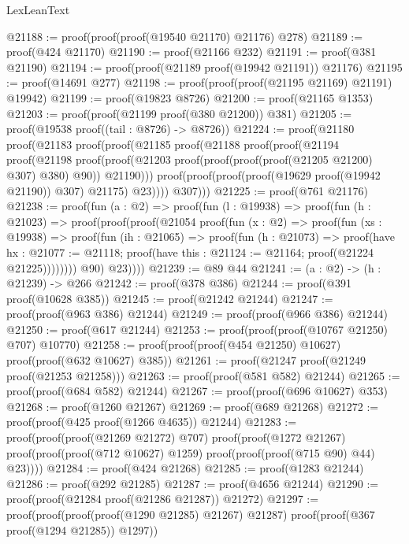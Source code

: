 \begin{lexlean}{LexLeanText}
\begin{coremodule}
@21188 := proof(proof(proof(@19540 @21170) @21176) @278)
@21189 := proof(@424 @21170)
@21190 := proof(@21166 @232)
@21191 := proof(@381 @21190)
@21194 := proof(proof(@21189 proof(@19942 @21191)) @21176)
@21195 := proof(@14691 @277)
@21198 := proof(proof(proof(@21195 @21169) @21191) @19942)
@21199 := proof(@19823 @8726)
@21200 := proof(@21165 @1353)
@21203 := proof(proof(@21199 proof(@380 @21200)) @381)
@21205 := proof(@19538 proof((tail : @8726) -> @8726))
@21224 := proof(@21180
      proof(@21183
          proof(proof(@21185
                proof(@21188
                    proof(proof(@21194
                          proof(@21198
                              proof(proof(@21203
                                    proof(proof(proof(proof(@21205 @21200) @307) @380) @90))
                                  @21190)))
                        proof(proof(proof(proof(@19629 proof(@19942 @21190)) @307) @21175) @23))))
              @307)))
@21225 := proof(@761 @21176)
@21238 := proof(fun (a : @2) =>
    proof(fun (l : @19938) =>
      proof(fun (h : @21023) =>
        proof(proof(proof(@21054
                proof(fun (x : @2) =>
                  proof(fun (xs : @19938) =>
                    proof(fun (ih : @21065) =>
                      proof(fun (h : @21073) =>
                        proof(have hx : @21077 := @21118;
                          proof(have this : @21124 := @21164; proof(@21224 @21225))))))))
              @90)
            @23))))
@21239 := @89 @44
@21241 := (a : @2) -> (h : @21239) -> @266
@21242 := proof(@378 @386)
@21244 := proof(@391 proof(@10628 @385))
@21245 := proof(@21242 @21244)
@21247 := proof(proof(@963 @386) @21244)
@21249 := proof(proof(@966 @386) @21244)
@21250 := proof(@617 @21244)
@21253 := proof(proof(proof(@10767 @21250) @707) @10770)
@21258 := proof(proof(proof(@454 @21250) @10627) proof(proof(@632 @10627) @385))
@21261 := proof(@21247 proof(@21249 proof(@21253 @21258)))
@21263 := proof(proof(@581 @582) @21244)
@21265 := proof(proof(@684 @582) @21244)
@21267 := proof(proof(@696 @10627) @353)
@21268 := proof(@1260 @21267)
@21269 := proof(@689 @21268)
@21272 := proof(proof(@425 proof(@1266 @4635)) @21244)
@21283 := proof(proof(proof(@21269 @21272) @707)
      proof(proof(@1272 @21267)
          proof(proof(proof(@712 @10627) @1259) proof(proof(proof(@715 @90) @44) @23))))
@21284 := proof(@424 @21268)
@21285 := proof(@1283 @21244)
@21286 := proof(@292 @21285)
@21287 := proof(@4656 @21244)
@21290 := proof(proof(@21284 proof(@21286 @21287)) @21272)
@21297 := proof(proof(proof(proof(@1290 @21285) @21267) @21287)
      proof(proof(@367 proof(@1294 @21285)) @1297))

\end{coremodule}
\end{lexlean}
